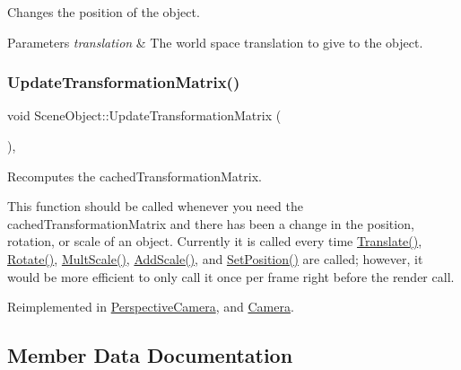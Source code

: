 Changes the position of the object. 


\begin{DoxyParams}{Parameters}
{\em translation} & The world space translation to give to the object. \\
\hline
\end{DoxyParams}
\hypertarget{class_scene_object_a20e31da3f9d2765de50cdb2d637ae6c9}{}\label{class_scene_object_a20e31da3f9d2765de50cdb2d637ae6c9} 
\subsubsection{\texorpdfstring{Update\+Transformation\+Matrix()}{UpdateTransformationMatrix()}}
{\footnotesize\ttfamily void Scene\+Object\+::\+Update\+Transformation\+Matrix (\begin{DoxyParamCaption}{ }\end{DoxyParamCaption})\hspace{0.3cm}{\ttfamily [protected]}, {\ttfamily [virtual]}}



Recomputes the cached\+Transformation\+Matrix. 

This function should be called whenever you need the cached\+Transformation\+Matrix and there has been a change in the position, rotation, or scale of an object. Currently it is called every time \hyperlink{class_scene_object_a04868377580069b0ee9d202bdb1b7159}{Translate()}, \hyperlink{class_scene_object_a0d27f5853e8e1718b1a77f0f1a6d4551}{Rotate()}, \hyperlink{class_scene_object_a00d73ad3f7d77bfc0d3c1869decb97ea}{Mult\+Scale()}, \hyperlink{class_scene_object_a40d7194cf79cad6ee3a2fa7c3d8ed95c}{Add\+Scale()}, and \hyperlink{class_scene_object_a1903672e77e88a1e220fcfa8e6afc1d4}{Set\+Position()} are called; however, it would be more efficient to only call it once per frame right before the render call. 

Reimplemented in \hyperlink{class_perspective_camera_a2f17fb07425e2146d5692805753fa368}{Perspective\+Camera}, and \hyperlink{class_camera_aea640c892a3807671d8ca49616d96eda}{Camera}.



\subsection{Member Data Documentation}
\hypertarget{class_scene_object_aac3f13eea8a7b455e8cffc6eceef211c}{}\label{class_scene_object_aac3f13eea8a7b455e8cffc6eceef211c} 
